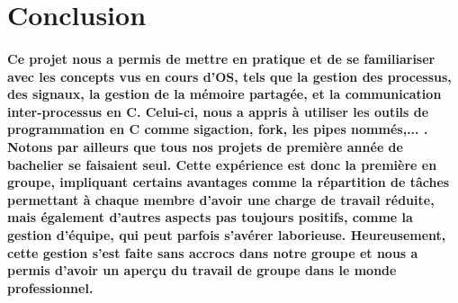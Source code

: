 \documentclass[utf8]{article}
\begin{document}
\section{Conclusion}
\paragraph{Ce projet nous a permis de mettre en pratique et de se familiariser avec les concepts vus en cours d'OS,
tels que la gestion des processus, des signaux, la gestion de la mémoire partagée, et la communication inter-processus en C.
Celui-ci, nous a appris à utiliser les outils de programmation en C comme sigaction, fork, les pipes nommés,... .
Notons par ailleurs que tous nos projets de première année de bachelier se faisaient seul. Cette expérience est donc
la première en groupe, impliquant certains avantages comme la répartition de tâches permettant à chaque membre d'avoir 
une charge de travail réduite, mais également d'autres aspects pas toujours positifs, comme la gestion d'équipe, qui peut 
parfois s'avérer laborieuse. Heureusement, cette gestion s'est faite sans accrocs dans notre groupe et nous a permis d'avoir
un aperçu du travail de groupe dans le monde professionnel.
}
\end{document}
